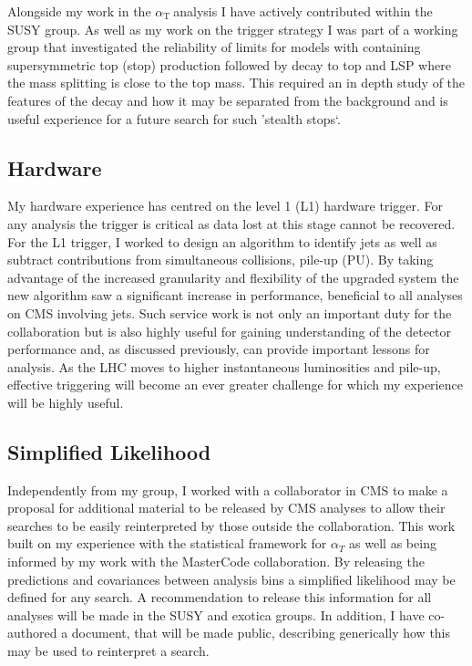 \documentclass[11pt]{article}
\theoremstyle{plain} \numberwithin{equation}{section}
\theoremstyle{definition}
\DeclareRobustCommand{\alphat}{$\alpha_{\text{T}}~$}
\begin{document}
Alongside my work in the \alphat analysis I have actively contributed within the SUSY group.
As well as my work on the trigger strategy I was part of a working group that investigated
the reliability of limits for models with containing supersymmetric top (stop) production followed by decay 
to top and LSP where the mass splitting is close to the top mass. This required an in depth study of the features of the decay and how it 
may be separated from the background and is useful experience for a future search for such 'stealth stops`.

\subsection*{Hardware}
My hardware experience has centred on the level 1 (L1) hardware trigger.
For any analysis the trigger is critical as data lost at this stage cannot be recovered. 
For the L1 trigger, I worked to design an algorithm to identify jets as well 
as subtract contributions from simultaneous collisions, 
pile-up (PU). By taking advantage of the increased granularity and flexibility of the 
upgraded system the new algorithm saw a significant increase in performance, beneficial
to all analyses on CMS involving jets. Such service work is not only an important duty for the collaboration but is also
highly useful for gaining understanding of the detector performance and, as discussed previously,
can provide important lessons for analysis. As the LHC moves to higher instantaneous 
luminosities and pile-up, effective triggering will become an ever greater challenge 
for which my experience will be highly useful. 

\subsection*{Simplified Likelihood}
Independently from my group, I worked with a collaborator in CMS to make a proposal 
for additional material to be released by CMS analyses
to allow their searches to be easily reinterpreted by those outside the collaboration. 
This work built on my experience with the statistical framework for $\alpha_T$ as well as being 
informed by my work with the MasterCode collaboration. By releasing the predictions and covariances between analysis bins 
a simplified likelihood may be defined for any search. A recommendation to release this information for all analyses
will be made in the SUSY and exotica groups. In addition, I have co-authored a document,
that will be made public, describing generically how this may be used to reinterpret a search.
\end{document}
